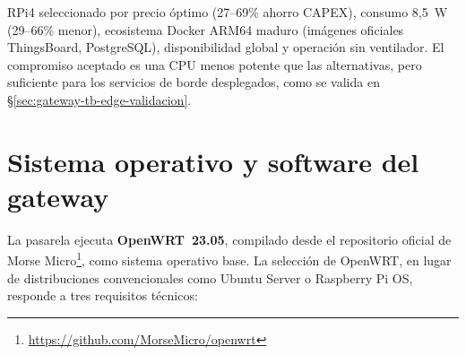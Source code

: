 \begin{table}[H]
\centering
\caption{Comparación de plataformas \emph{hardware} para pasarela de borde}
\label{tab:gateway-hw-comparison}
\end{table}

RPi4 seleccionado por precio óptimo (27--69\% ahorro CAPEX), consumo 8,5~W (29--66\% menor), ecosistema Docker ARM64 maduro (imágenes oficiales ThingsBoard, PostgreSQL), disponibilidad global y operación sin ventilador.  El compromiso aceptado es una CPU menos potente que las alternativas, pero suficiente para los servicios de borde desplegados, como se valida en §\ref{sec:gateway-tb-edge-validacion}.


\section{Sistema operativo y software del gateway}
\label{sec:gateway-sw}
\label{sec:gateway-openwrt}

La pasarela ejecuta \textbf{OpenWRT~23.05}, compilado desde el repositorio oficial de Morse Micro\footnote{\url{https://github.com/MorseMicro/openwrt}}, como sistema operativo base.  La selección de OpenWRT, en lugar de distribuciones convencionales como Ubuntu Server o Raspberry Pi OS, responde a tres requisitos técnicos:

